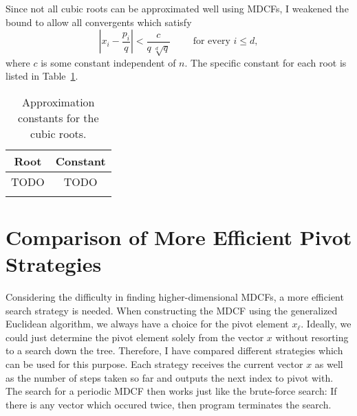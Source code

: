 Since not all cubic roots can be approximated well using MDCFs,
I weakened the bound to allow all convergents which satisfy
\[
  \left|x_i - \frac{p_i}{q}\right| < \frac{c}{q \, \sqrt[d]{q}} \qquad \text{ for every } i ≤ d,
\]
where $c$ is some constant independent of $n$.
The specific constant for each root is listed in Table~\ref{tbl:approx-const}.
\begin{table}[tbp]
  \centering
  \begin{tabular}{cc}
    \uzlhline
    Root & Constant \\
    \hline
    TODO & TODO \\
    \uzlhline
  \end{tabular}
  \caption{Approximation constants for the cubic roots.}
  \label{tbl:approx-const}
\end{table}




\section{Comparison of More Efficient Pivot Strategies}

Considering the difficulty in finding higher-dimensional MDCFs,
a more efficient search strategy is needed.
When constructing the MDCF using the generalized Euclidean algorithm,
we always have a choice for the pivot element $x_ℓ$.
Ideally, we could just determine the pivot element solely from the vector $x$
without resorting to a search down the tree.
Therefore, I have compared different strategies which can be used for this purpose.
Each strategy receives the current vector $x$ as well as the number of steps
taken so far and outputs the next index to pivot with.
The search for a periodic MDCF then works just like the brute-force search:
If there is any vector which occured twice, then program terminates the search.


